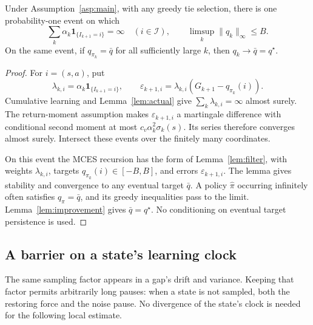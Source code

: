 \begin{lemma}\label{lem:stability}
Under Assumption~\ref{asp:main}, with any greedy tie
selection, there is one probability-one event on which
\[
\sum_k\alpha_k\mathbf1_{\{I_{k+1}=i\}}=\infty\quad(i\in\mathcal I),\qquad
\limsup_k\|q_k\|_\infty\le B.
\]
On the same event, if $q_{\pi_k}=\bar q$ for all sufficiently large $k$, then $q_k\to\bar q=q^\star$.
\end{lemma}
\begin{proof}
For $i=(s,a)$, put
\[
\lambda_{k,i}=\alpha_k\mathbf1_{\{I_{k+1}=i\}},\qquad
\varepsilon_{k+1,i}=\lambda_{k,i}(G_{k+1}-q_{\pi_k}(i)).
\]
Cumulative learning and Lemma~\ref{lem:actual} give $\sum_k\lambda_{k,i}=\infty$ almost surely. The return-moment
assumption makes $\varepsilon_{k+1,i}$ a martingale difference with conditional second moment at most
$c_v\alpha_k^2\sigma_k(s)$. Its series therefore converges almost surely. Intersect these events over the finitely
many coordinates.

On this event the MCES recursion has the form of Lemma~\ref{lem:filter}, with weights $\lambda_{k,i}$, targets
$q_{\pi_k}(i)\in[-B,B]$, and errors $\varepsilon_{k+1,i}$. The lemma gives stability and convergence to any
eventual target $\bar q$. A policy $\widehat\pi$ occurring infinitely often satisfies $q_{\widehat\pi}=\bar q$, and its greedy
inequalities pass to the limit. Lemma~\ref{lem:improvement} gives $\bar q=q^\star$. No conditioning on eventual target
persistence is used.
\end{proof}

\subsection{A barrier on a state's learning clock}
The same sampling factor appears in a gap's drift and variance. Keeping that factor permits
arbitrarily long pauses: when a state is not sampled, both the restoring force and the noise
pause. No divergence of the state's clock is needed for the following local estimate.

